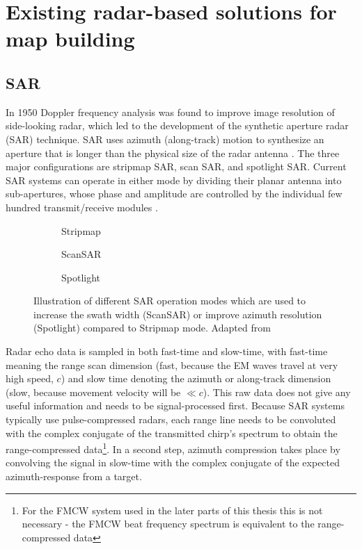 \section{Existing radar-based solutions for map building}\label{existing-radar-based-solutions-for-map-building}

\subsection{SAR}\label{sar}

In 1950 Doppler frequency analysis was found to improve image resolution
of side-looking radar, which led to the development of the synthetic
aperture radar (SAR) technique. SAR uses azimuth (along-track) motion to
synthesize an aperture that is longer than the physical size of the
radar antenna \cite{Wang2008}. The three major configurations are
stripmap SAR, scan SAR, and spotlight SAR. Current SAR systems can
operate in either mode by dividing their planar antenna into
sub-apertures, whose phase and amplitude are controlled by the
individual few hundred transmit/receive modules \cite{Moreira2013}.

\begin{figure}[htp]
    \begin{subfigure}{\linewidth}
        \centering
        \def\svgscale{1.0}
        
        \caption{Stripmap}
        \bigskip
    \end{subfigure}
    \begin{subfigure}{0.45\linewidth}
        \centering
        \def\svgscale{0.75}
        
        \caption{ScanSAR}
    \end{subfigure}
    \hfill
    \begin{subfigure}{0.45\linewidth}
        \centering
        \def\svgscale{0.75}
        
        \caption{Spotlight}
    \end{subfigure}
    \caption{\label{fig:sar_modes}Illustration of different SAR operation modes which are used to increase the swath width (ScanSAR) or improve azimuth resolution (Spotlight) compared to Stripmap mode. Adapted from \cite{Moreira2013}}
\end{figure}

Radar echo data is sampled in both fast-time and slow-time, with
fast-time meaning the range scan dimension (fast, because the EM waves
travel at very high speed, \(c\)) and slow time denoting the azimuth or
along-track dimension (slow, because movement velocity will be
\(\ll c\)). This raw data does not give any useful information and needs
to be signal-processed first. Because SAR systems typically use
pulse-compressed radars, each range line needs to be convoluted with the
complex conjugate of the transmitted chirp's spectrum to obtain the
range-compressed
data\footnote{For the FMCW system used in the later parts of this thesis this is not necessary - the FMCW beat frequency spectrum is equivalent to the range-compressed data}.
In a second step, azimuth compression takes place by convolving the
signal in slow-time with the complex conjugate of the expected
azimuth-response from a target.

